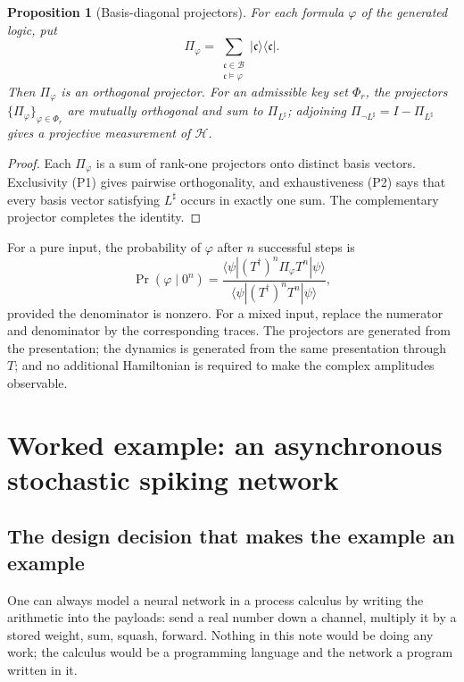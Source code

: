 \documentclass[11pt,a4paper]{article}
\theoremstyle{plain}
\newtheorem{proposition}[theorem]{Proposition}
\theoremstyle{definition}
\theoremstyle{remark}
\begin{document}
\begin{proposition}[Basis-diagonal projectors]
\label{prop:projective}
For each formula $\varphi$ of the generated logic, put
\[
\Pi_\varphi
 =
\sum_{\substack{\mathfrak{c}\in\mathcal{B}\\ \mathfrak{c}\models\varphi}}
|\mathfrak{c}\rangle\langle\mathfrak{c}|.
\]
Then $\Pi_\varphi$ is an orthogonal projector. For an admissible key set $\Phi_r$, the projectors
$\{\Pi_\varphi\}_{\varphi\in\Phi_r}$ are mutually orthogonal and sum to $\Pi_{L^\sharp}$; adjoining
$\Pi_{\neg L^\sharp}=I-\Pi_{L^\sharp}$ gives a projective measurement of $\mathcal{H}$.
\end{proposition}

\begin{proof}
Each $\Pi_\varphi$ is a sum of rank-one projectors onto distinct basis vectors. Exclusivity (P1)
gives pairwise orthogonality, and exhaustiveness (P2) says that every basis vector satisfying
$L^\sharp$ occurs in exactly one sum. The complementary projector completes the identity.
\end{proof}

For a pure input, the probability of $\varphi$ after $n$ successful steps is
\[
\Pr(\varphi\mid 0^n)
 =
\frac{\langle\psi|(T^\dagger)^n\Pi_\varphi T^n|\psi\rangle}
     {\langle\psi|(T^\dagger)^nT^n|\psi\rangle},
\]
provided the denominator is nonzero. For a mixed input, replace the numerator and denominator by the
corresponding traces. The projectors are generated from the presentation; the dynamics is generated
from the same presentation through $T$; and no additional Hamiltonian is required to make the
complex amplitudes observable.

\section{Worked example: an asynchronous stochastic spiking network}
\label{sec:rnn}

\subsection{The design decision that makes the example an example}

One can always model a neural network in a process calculus by writing the arithmetic into the
payloads: send a real number down a channel, multiply it by a stored weight, sum, squash, forward.
Nothing in this note would be doing any work; the calculus would be a programming language and the
network a program written in it.
\end{document}
